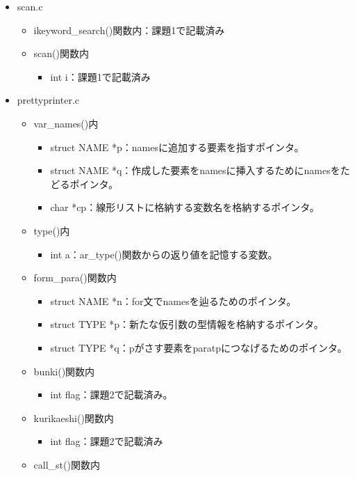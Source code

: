 \documentclass{jarticle}
\begin{document}
\begin{itemize}
  \item scan.c
  \begin{itemize}
    \item ikeyword\_search()関数内：課題1で記載済み
    \item scan()関数内
    \begin{itemize}
      \item int i：課題1で記載済み
    \end{itemize}
  \end{itemize}
  \item prettyprinter.c
  \begin{itemize}
    \item var\_names()内
    \begin{itemize}
      \item struct NAME *p：namesに追加する要素を指すポインタ。
      \item struct NAME *q：作成した要素をnamesに挿入するためにnamesをたどるポインタ。
      \item char *cp：線形リストに格納する変数名を格納するポインタ。
    \end{itemize}
    \item type()内
    \begin{itemize}
      \item int a：ar\_type()関数からの返り値を記憶する変数。
    \end{itemize}
    \item form\_para()関数内
    \begin{itemize}
      \item struct NAME *n：for文でnamesを辿るためのポインタ。
      \item struct TYPE *p：新たな仮引数の型情報を格納するポインタ。
      \item struct TYPE *q：pがさす要素をparatpにつなげるためのポインタ。
    \end{itemize}
    \item bunki()関数内
    \begin{itemize}
      \item int flag：課題2で記載済み。
    \end{itemize}
    \item kurikaeshi()関数内
    \begin{itemize}
      \item
      int
      flag：課題2で記載済み
    \end{itemize}
    \item call\_st()関数内

\end{itemize}
\end{itemize}
\end{document}
